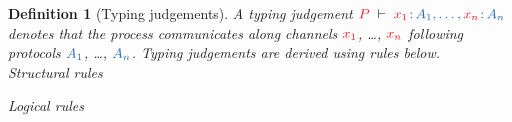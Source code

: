 \documentclass[submission,copyright,creativecommons]{eptcs}
\newtheorem{definition}[lemma]{Definition}
\begin{document}
\begin{definition}[Typing judgements]\label{def:cp}
  A typing judgement $\seq[{ P }]{\tmty{x_1}{A_1}, \dots, \tmty{x_n}{A_n}}$
  denotes that the process  communicates along channels $\tm{x_1}$, \dots,
  $\tm{x_n}$ following protocols $\ty{A_1}$, \dots, $\ty{A_n}$. Typing
  judgements are derived using rules below.
  \\[1\baselineskip]
  {Structural rules}
  \begin{center}
    \cpInfAx \cpInfCut
  \end{center}
	{Logical rules}
  \begin{center}
    \cpInfTens \cpInfParr
  \end{center}
  \begin{center}
    \cpInfBot
    \cpInfOne
  \end{center}
  \begin{center}
  \end{center}
  \begin{center}
    \cpInfWith
  \end{center}
  \begin{center}
    \cpInfNil
    \cpInfTop   
  \end{center}
\end{definition}
\end{document}
